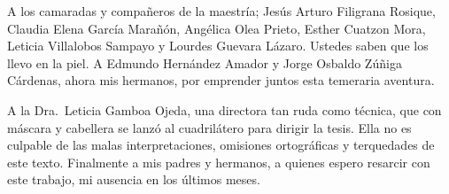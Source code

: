 \documentclass[14pt,twoside,final]{extbook} %
\begin{document}
A los camaradas y compañeros de la maestría; Jesús Arturo Filigrana Rosique, Claudia Elena García Marañón, Angélica Olea Prieto, Esther Cuatzon Mora, Leticia Villalobos Sampayo y Lourdes Guevara Lázaro. Ustedes saben que los llevo en la piel. A Edmundo Hernández Amador y Jorge Osbaldo Zúñiga Cárdenas, ahora mis hermanos, por emprender juntos esta temeraria aventura.

A la Dra.~Leticia Gamboa Ojeda, una directora tan ruda como técnica, que con máscara y cabellera se lanzó al cuadrilátero para dirigir la tesis. Ella no es culpable de las malas interpretaciones, omisiones ortográficas y terquedades de este texto. Finalmente a mis padres y hermanos, a quienes espero resarcir con este trabajo, mi ausencia en los últimos meses.
\cleardoublepage %
\makeatletter
\renewcommand\@dotsep{200} %
\makeatother
\renewcommand{\contentsname}{Contenidos}
\thispagestyle{empty}
\pagestyle{fancy}
\fancyhf{} %
\fancyhead[RO,LE]{\thepage}
\fancyfoot{}
\renewcommand{\headrulewidth}{0pt}
\setcounter{page}{11}
\tableofcontents
\makeatletter
\renewcommand\@dotsep{200} %
\makeatother
\renewcommand{\listtablename}{Cuadros}
\listoftables
\thispagestyle{empty}
\pagestyle{fancy}
\fancyhf{} %
\fancyhead[RO,LE]{\thepage}
\fancyfoot{}
\renewcommand{\headrulewidth}{0pt}
\setcounter{page}{13}
\makeatletter
\renewcommand\@dotsep{200} %
\makeatother
\renewcommand{\listfigurename}{Imágenes}
\listoffigures
\thispagestyle{empty}
\pagestyle{fancy}
\fancyhf{} %
\fancyhead[RO,LE]{\thepage}
\fancyfoot{}
\renewcommand{\headrulewidth}{0pt}
\setcounter{page}{15}
\end{document}

